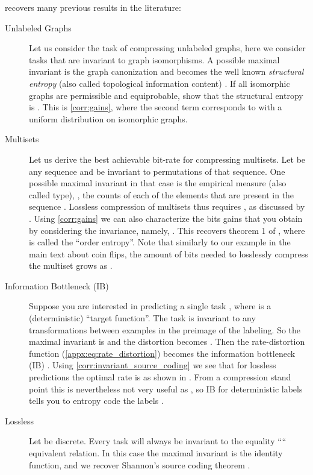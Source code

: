 \documentclass[final]{article}
\begin{document}
 recovers many previous results in the literature:
\begin{description}
\item[Unlabeled Graphs] 
Let us consider the task of compressing unlabeled graphs, here we consider tasks that are invariant to graph isomorphisms.
A possible maximal invariant is the graph canonization and  becomes the well known \textit{structural entropy} (also called topological information content) \cite{rashevsky_life_1955,yongwook_choi_compression_2009}.
If all isomorphic graphs are permissible and equiprobable, \citet{yongwook_choi_compression_2009} show that the structural entropy is  .
This is \cref{corr:gains}, where the second term corresponds to  with a uniform distribution on isomorphic graphs.
\item[Multisets] 
Let us derive the best achievable bit-rate for compressing multisets.
Let  be any sequence and  be invariant to permutations of that sequence.
One possible maximal invariant in that case is the empirical measure (also called type), \ie, the counts  of each of the  elements that are present in the sequence .
Lossless compression of multisets thus requires , as discussed by \citet{varshney_benefiting_2007}.
Using \cref{corr:gains} we can also characterize the bits gains that you obtain by considering the invariance, namely, .
This recovers theorem 1 of \citet{varshney_benefiting_2007}, where  is called the ``order entropy''.
Note that similarly to our example in the main text about \iid coin flips, the amount of bits needed to losslessly compress the multiset grows as   \cite{varshney_benefiting_2007}. 
\item[Information Bottleneck (IB)] 
Suppose you are interested in predicting a single task , where  is a (deterministic) ``target function''.
The task is invariant to any transformations between examples in the preimage of the labeling.
So the maximal invariant is  and the distortion becomes .
Then the rate-distortion function (\cref{appx:eq:rate_distortion}) becomes the information bottleneck (IB) \cite{tishby_information_2000}.
Using \cref{corr:invariant_source_coding} we see that for lossless predictions the optimal rate is  as  shown in \cite{wu_learnability_2019,fischer_conditional_2020}.
From a compression stand point this is nevertheless not very useful as , so IB for deterministic labels tells you to entropy code the labels . 
\item[Lossless]
Let  be discrete.
Every task will always be invariant to the equality ```` equivalent relation.
In this case the maximal invariant is the identity function, and we recover Shannon's source coding theorem .
\end{description}
\end{document}
